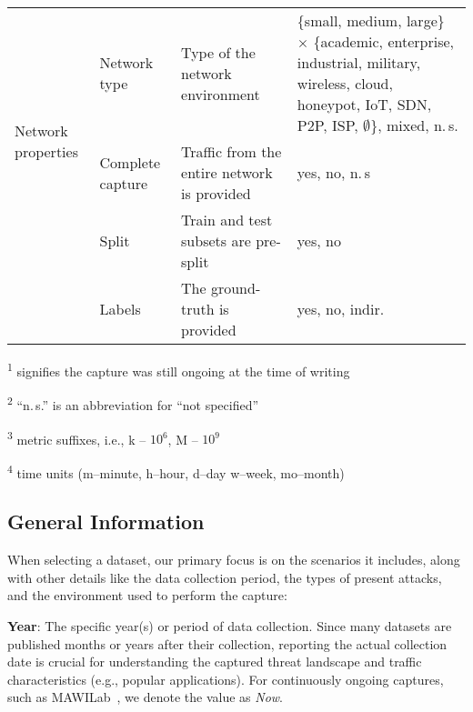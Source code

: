 \begin{table*}[t]
\begin{tabular}{p{1.9cm} p{1.85cm} p{5.9cm} p{7cm}}
    \multirow{3}{2cm}[-\baselineskip]{\centering Network properties}
     & Network type & Type of the network environment & \{small, medium, large\} $\times$ \{academic, enterprise, industrial, military, wireless, cloud, honeypot, IoT, SDN, P2P, ISP, $\emptyset$\}, mixed, n.\,s. \\
     & Complete capture & Traffic from the entire network is provided & yes, no, n.\,s \\ \midrule

     \multirow{2}{2cm}[0pt]{\centering Evaluation}
      & Split & Train and test subsets are pre-split & yes, no \\
      & Labels & The ground-truth is provided & yes, no, indir.
     \\ \bottomrule
    \end{tabular}
    \label{tab:collected_features}
\begin{minipage}{0.49\textwidth}
{\small \vspace{0.4em}
\textsuperscript{1} signifies the capture was still ongoing at the time of writing

\textsuperscript{2} ``n.\,s.'' is an abbreviation for ``not specified''
}
\end{minipage}
\begin{minipage}{0.49\textwidth}
{\small \vspace{0.4em}
\textsuperscript{3} metric suffixes, i.e., k -- $10^6$, M -- $10^9$

\textsuperscript{4} time units (m\;--\;minute, h\;--\;hour, d\;--\;day w\;--\;week, mo\;--\;month)
}
\end{minipage}
\end{table*}

\subsection{General Information}
\label{ssec:dprops_general_info}

When selecting a dataset, our primary focus is on the scenarios it includes, along with other details like the data collection period, the types of present attacks, and the environment used to perform the capture:

\textbf{Year}: The specific year(s) or period of data collection. Since many datasets are published months or years after their collection, reporting the actual collection date is crucial for understanding the captured threat landscape and traffic characteristics (e.g., popular applications). For continuously ongoing captures, such as MAWILab~\cite{fontugne2010_mawilab}, we denote the value as \emph{Now}.

